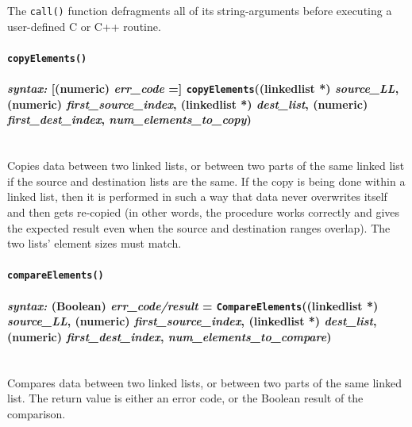 \documentclass{article}
\begin{document}
The \texttt{call()} function defragments all of its string-arguments before executing a user-defined C or C++ routine.\\




\paragraph{\texttt{copyElements()}\\\\
\normalfont \emph{syntax: } [(numeric) \emph{err\_code} =] \texttt{copyElements}((linkedlist *) \emph{source\_LL}, (numeric) \emph{first\_source\_index}, (linkedlist *) \emph{dest\_list}, (numeric) \emph{first\_dest\_index}, \emph{num\_elements\_to\_copy})\\\\}

Copies data between two linked lists, or between two parts of the same linked list if the source and destination lists are the same.  If the copy is being done within a linked list, then it is performed in such a way that data never overwrites itself and then gets re-copied (in other words, the procedure works correctly and gives the expected result even when the source and destination ranges overlap).  The two lists' element sizes must match.\\




\paragraph{\texttt{compareElements()}\\\\
\normalfont \emph{syntax: } (Boolean) \emph{err\_code/result} = \texttt{CompareElements}((linkedlist *) \emph{source\_LL}, (numeric) \emph{first\_source\_index}, (linkedlist *) \emph{dest\_list}, (numeric) \emph{first\_dest\_index}, \emph{num\_elements\_to\_compare})\\\\}

Compares data between two linked lists, or between two parts of the same linked list.  The return value is either an error code, or the Boolean result of the comparison.\\
\end{document}

